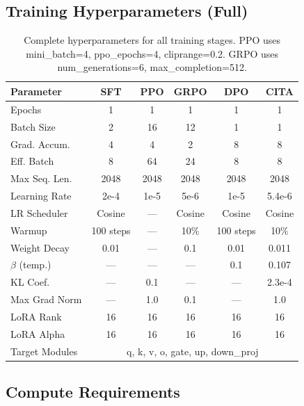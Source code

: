 \subsection{Training Hyperparameters (Full)}

\begin{table}[H]
\centering
\scriptsize
\setlength{\tabcolsep}{2pt}
\begin{tabular}{@{}lccccc@{}}
\toprule
\textbf{Parameter} & \textbf{SFT} & \textbf{PPO} & \textbf{GRPO} & \textbf{DPO} & \textbf{CITA} \\
\midrule
Epochs & 1 & 1 & 1 & 1 & 1 \\
\hline
Batch Size & 2 & 16 & 12 & 1 & 1 \\
\hline
Grad. Accum. & 4 & 4 & 2 & 8 & 8 \\
\hline
Eff. Batch & 8 & 64 & 24 & 8 & 8 \\
\hline
Max Seq. Len. & 2048 & 2048 & 2048 & 2048 & 2048 \\
\hline
Learning Rate & 2e-4 & 1e-5 & 5e-6 & 1e-5 & 5.4e-6 \\
\hline
LR Scheduler & Cosine & --- & Cosine & Cosine & Cosine \\
\hline
Warmup & 100 steps & --- & 10\% & 100 steps & 10\% \\
\hline
Weight Decay & 0.01 & --- & 0.1 & 0.01 & 0.011 \\
\hline
$\beta$ (temp.) & --- & --- & --- & 0.1 & 0.107 \\
\hline
KL Coef. & --- & 0.1 & --- & --- & 2.3e-4 \\
\hline
Max Grad Norm & --- & 1.0 & 0.1 & --- & 1.0 \\
\hline
LoRA Rank & 16 & 16 & 16 & 16 & 16 \\
\hline
LoRA Alpha & 16 & 16 & 16 & 16 & 16 \\
\hline
Target Modules & \multicolumn{5}{c}{q, k, v, o, gate, up, down\_proj} \\
\bottomrule
\end{tabular}
\caption{Complete hyperparameters for all training stages. PPO uses mini\_batch=4, ppo\_epochs=4, cliprange=0.2. GRPO uses num\_generations=6, max\_completion=512.}
\label{tab:full_hyperparams}
\end{table}

\subsection{Compute Requirements}


